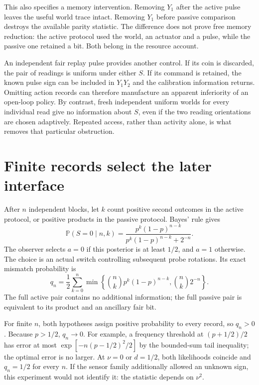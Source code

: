 \documentclass[11pt,a4paper]{article}
\newcommand{\Prb}{\mathbb P}
\begin{document}
This also specifies a memory intervention. Removing $Y_1$ after the active pulse leaves the useful world trace intact. Removing $Y_1$ before passive comparison destroys the available parity statistic. The difference does not prove free memory reduction: the active protocol used the world, an actuator and a pulse, while the passive one retained a bit. Both belong in the resource account.

An independent fair replay pulse provides another control. If its coin is discarded, the pair of readings is uniform under either $S$. If its command is retained, the known pulse sign can be included in $Y_1Y_2$ and the calibration information returns. Omitting action records can therefore manufacture an apparent inferiority of an open-loop policy. By contrast, fresh independent uniform worlds for every individual read give no information about $S$, even if the two reading orientations are chosen adaptively. Repeated access, rather than activity alone, is what removes that particular obstruction.

\section{Finite records select the later interface}

After $n$ independent blocks, let $k$ count positive second outcomes in the active protocol, or positive products in the passive protocol. Bayes' rule gives
\begin{equation}\label{eq:posterior}
 \Prb(S=0\mid n,k)=
 \frac{p^k(1-p)^{n-k}}{p^k(1-p)^{n-k}+2^{-n}}.
\end{equation}
The observer selects $a=0$ if this posterior is at least $1/2$, and $a=1$ otherwise. The choice is an actual switch controlling subsequent probe rotations. Its exact mismatch probability is
\begin{equation}\label{eq:q}
 q_n=\frac12\sum_{k=0}^n\min\left\{
 \binom nk p^k(1-p)^{n-k},\binom nk2^{-n}\right\}.
\end{equation}
The full active pair contains no additional information; the full passive pair is equivalent to its product and an ancillary fair bit.

For finite $n$, both hypotheses assign positive probability to every record, so $q_n>0$. Because $p>1/2$, $q_n\to0$. For example, a frequency threshold at $(p+1/2)/2$ has error at most $\exp[-n(p-1/2)^2/2]$ by the bounded-sum tail inequality; the optimal error is no larger. At $\nu=0$ or $d=1/2$, both likelihoods coincide and $q_n=1/2$ for every $n$. If the sensor family additionally allowed an unknown sign, this experiment would not identify it: the statistic depends on $\nu^2$.
\end{document}
